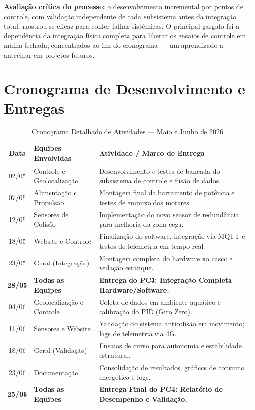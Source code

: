 \documentclass[12pt,a4paper]{article}
\begin{document}
\textbf{Avaliação crítica do processo:} o desenvolvimento incremental por pontos de controle, com validação independente de cada subsistema antes da integração total, mostrou-se eficaz para conter falhas sistêmicas. O principal gargalo foi a dependência da integração física completa para liberar os ensaios de controle em malha fechada, concentrados ao fim do cronograma — um aprendizado a antecipar em projetos futuros.

\section{Cronograma de Desenvolvimento e Entregas}

\begin{table}[h!]
\centering
\caption{Cronograma Detalhado de Atividades — Maio e Junho de 2026}
\label{tab:cronograma_detalhado}
\renewcommand{\arraystretch}{1.3}
\begin{tabular}{|c|p{}|p{}|}
\hline
\rowcolor{gray!20}
\textbf{Data} & \textbf{Equipes Envolvidas} & \textbf{Atividade / Marco de Entrega} \\ \hline
02/05 & Controle e Geolocalização & Desenvolvimento e testes de bancada do subsistema de controle e fusão de dados. \\ \hline
07/05 & Alimentação e Propulsão & Montagem final do barramento de potência e testes de empuxo dos motores. \\ \hline
12/05 & Sensores de Colisão & Implementação do novo sensor de redundância para melhoria da zona cega. \\ \hline
18/05 & Website e Controle & Finalização do software, integração via MQTT e testes de telemetria em tempo real. \\ \hline
23/05 & Geral (Integração) & Montagem completa do hardware no casco e vedação estanque. \\ \hline
\textbf{28/05} & \textbf{Todas as Equipes} & \textbf{Entrega do PC3: Integração Completa Hardware/Software.} \\ \hline
04/06 & Geolocalização e Controle & Coleta de dados em ambiente aquático e calibração do PID (Giro Zero). \\ \hline
11/06 & Sensores e Website & Validação do sistema anticolisão em movimento; logs de telemetria via 4G. \\ \hline
18/06 & Geral (Validação) & Ensaios de curso para autonomia e estabilidade estrutural. \\ \hline
23/06 & Documentação & Consolidação de resultados, gráficos de consumo energético e logs. \\ \hline
\textbf{25/06} & \textbf{Todas as Equipes} & \textbf{Entrega Final do PC4: Relatório de Desempenho e Validação.} \\ \hline
\end{tabular}
\end{table}
\end{document}
